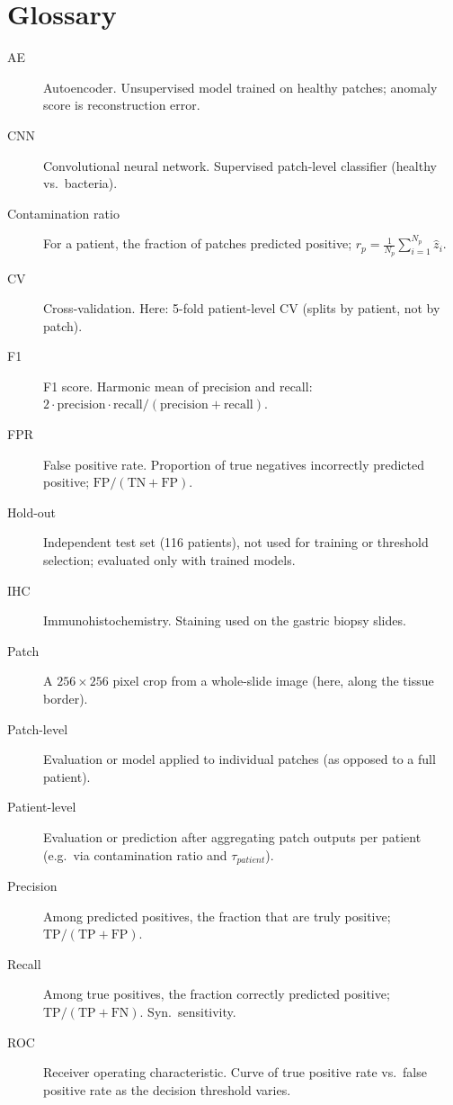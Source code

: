 \documentclass[11pt,a4paper]{article}
\begin{document}
\tableofcontents
\newpage

\section*{Glossary}
\label{sec:glossary}

\begin{description}
  \item[AE] Autoencoder. Unsupervised model trained on healthy patches; anomaly score is reconstruction error.
  \item[CNN] Convolutional neural network. Supervised patch-level classifier (healthy vs.\ bacteria).
  \item[Contamination ratio] For a patient, the fraction of patches predicted positive; $r_p = \frac{1}{N_p}\sum_{i=1}^{N_p} \hat{z}_i$.
  \item[CV] Cross-validation. Here: 5-fold patient-level CV (splits by patient, not by patch).
  \item[F1] F1 score. Harmonic mean of precision and recall: $2 \cdot \mathrm{precision} \cdot \mathrm{recall} / (\mathrm{precision} + \mathrm{recall})$.
  \item[FPR] False positive rate. Proportion of true negatives incorrectly predicted positive; $\mathrm{FP}/(\mathrm{TN}+\mathrm{FP})$.
  \item[Hold-out] Independent test set (116 patients), not used for training or threshold selection; evaluated only with trained models.
  \item[IHC] Immunohistochemistry. Staining used on the gastric biopsy slides.
  \item[Patch] A $256\times256$ pixel crop from a whole-slide image (here, along the tissue border).
  \item[Patch-level] Evaluation or model applied to individual patches (as opposed to a full patient).
  \item[Patient-level] Evaluation or prediction after aggregating patch outputs per patient (e.g.\ via contamination ratio and $\tau_{patient}$).
  \item[Precision] Among predicted positives, the fraction that are truly positive; $\mathrm{TP}/(\mathrm{TP}+\mathrm{FP})$.
  \item[Recall] Among true positives, the fraction correctly predicted positive; $\mathrm{TP}/(\mathrm{TP}+\mathrm{FN})$. Syn.\ sensitivity.
  \item[ROC] Receiver operating characteristic. Curve of true positive rate vs.\ false positive rate as the decision threshold varies.

\end{description}
\end{document}
